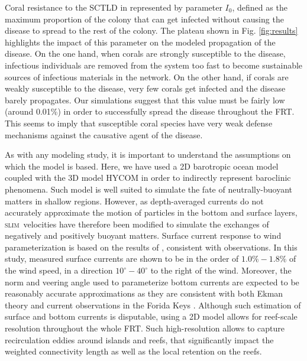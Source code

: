 \documentclass[utf8]{frontiersSCNS}
\newcommand{\slim}{\textsc{slim}\ }
\begin{document}
Coral resistance to the SCTLD in represented by parameter $I_0$, defined as the maximum proportion of the colony that can get infected without causing the disease to spread to the rest of the colony. The plateau shown in Fig. \ref{fig:results} highlights the impact of this parameter on the modeled propagation of the disease. On the one hand, when corals are strongly susceptible to the disease, infectious individuals are removed from the system too fast to become sustainable sources of infectious materials in the network. On the other hand, if corals are weakly susceptible to the disease, very few corals get infected and the disease barely propagates. Our simulations suggest that this value must be fairly low (around 0.01\%) in order to successfully spread the disease throughout the FRT. This seems to imply that susceptible coral species have very weak defense mechanisms against the causative agent of the disease.

As with any modeling study, it is important to understand the assumptions on which the model is based. Here, we have used a 2D barotropic ocean model coupled with the 3D model HYCOM \citep{Chassignet2007} in order to indirectly represent baroclinic phenomena. Such model is well suited to simulate the fate of neutrally-buoyant matters in shallow regions. However, as depth-averaged currents do not accurately approximate the motion of particles in the bottom and surface layers, \slim velocities have therefore been modified to simulate the exchanges of negatively and positively buoyant matters. Surface current response to wind parameterization is based on the results of \cite{ardhuin2009observation}, consistent with observations. In this study, measured surface currents are shown to be in the order of $1.0\% - 1.8\%$ of the wind speed, in a direction $10^\circ - 40^\circ$ to the right of the wind. Moreover, the norm and veering angle used to parameterize bottom currents are expected to be reasonably accurate approximations as they are consistent with both Ekman theory and current observations in the Forida Keys \citep{perlin2007organization, kundu1976ekman, smith2009influence}. Although such estimation of surface and bottom currents is disputable, using a 2D model allows for reef-scale resolution throughout the whole FRT. Such high-resolution allows to capture recirculation eddies around islands and reefs, that significantly impact the weighted connectivity length as well as the local retention on the reefs.
\end{document}
